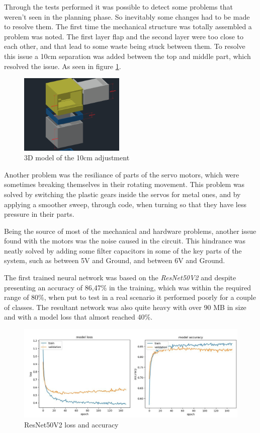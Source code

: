 \documentclass[a4paper,11pt]{article}
\begin{document}
Through the tests performed it was possible to detect some problems that weren't seen in the planning phase. So inevitably some changes had to be made to resolve them. The first time the mechanical structure was totally assembled a problem was noted. The first layer flap and the second layer were too close to each other, and that lead to some waste being stuck between them. To resolve this issue a 10cm separation was added between the top and middle part, which resolved the issue. As seen in figure \ref{fig:adjustment}.

\begin{figure}[H]
  \centering
  \includegraphics[width=5cm]{Figures/Middle part adjustment.png}
  \caption{\small{3D model of the 10cm adjustment}}
  \label{fig:adjustment}
\end{figure}

Another problem was the resiliance of parts of the servo motors, which were sometimes breaking themselves in their rotating movement. This problem was solved by switching the plastic gears inside the servos for metal ones, and by applying a smoother sweep, through code, when turning so that they have less pressure in their parts.

Being the source of most of the mechanical and hardware problems, another issue found with the motors was the noise caused in the circuit. This hindrance was neatly solved by adding some filter capacitors in some of the key parts of the system, such as between 5V and Ground, and between 6V and Ground.


The first trained neural network was based on the \textit{ResNet50V2} and despite presenting an accuracy of 86,47\% in the training, which was within the required range of 80\%, when put to test in a real scenario it performed poorly for a couple of classes. The resultant network was also quite heavy with over 90 MB in size and with a model loss that almost reached 40\%.

\begin{figure}[H]
  \centering
  \includegraphics[width=12cm]{Figures/ResNet50V2_Loss_Acc.jpg}
  \caption{\small{ResNet50V2 loss and accuracy}}
  \label{fig:resnetLossAcc}
\end{figure}
\end{document}
